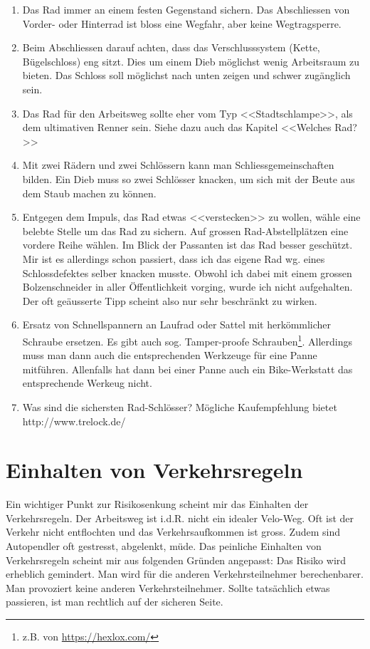 \begin{enumerate}
  \item Das Rad immer an einem festen Gegenstand sichern. Das Abschliessen von Vorder- oder Hinterrad ist bloss eine 
    Wegfahr, aber keine Wegtragsperre.

  \item Beim Abschliessen darauf achten, dass das Verschlusssystem (Kette, Bügelschloss) eng sitzt.
    Dies um einem Dieb möglichst wenig Arbeitsraum zu bieten. Das Schloss soll möglichst nach unten zeigen und
    schwer zugänglich sein.

  \item Das Rad für den Arbeitsweg sollte eher vom Typ <<Stadtschlampe>>, als dem ultimativen Renner sein.
    Siehe dazu auch das Kapitel <<Welches Rad?>>

  \item Mit zwei Rädern und zwei Schlössern kann man Schliessgemeinschaften bilden.
    Ein Dieb muss so zwei Schlösser knacken, um sich mit der Beute aus dem Staub machen zu können.

  \item Entgegen dem Impuls, das Rad etwas <<verstecken>> zu wollen, wähle eine belebte Stelle um das Rad zu sichern.
    Auf grossen Rad-Abstellplätzen eine vordere Reihe wählen.
    Im Blick der Passanten ist das Rad besser geschützt.
    Mir ist es allerdings schon passiert, dass ich das eigene Rad wg. eines Schlossdefektes selber knacken musste.
    Obwohl ich dabei mit einem grossen Bolzenschneider in aller Öffentlichkeit vorging, wurde ich nicht aufgehalten.
    Der oft geäusserte Tipp scheint also nur sehr beschränkt zu wirken.

  \item Ersatz von Schnellspannern an Laufrad oder Sattel mit herkömmlicher Schraube ersetzen.
    Es gibt auch sog. Tamper-proofe Schrauben\footnote{z.B. von \url{https://hexlox.com/}}.
    Allerdings muss man dann auch die entsprechenden Werkzeuge
    für eine Panne mitführen.
    Allenfalls hat dann bei einer Panne auch ein Bike-Werkstatt das entsprechende Werkeug nicht.

  \item Was sind die sichersten Rad-Schlösser? Mögliche Kaufempfehlung bietet http://www.trelock.de/

\end{enumerate}

\section{Einhalten von Verkehrsregeln}
Ein wichtiger Punkt zur Risikosenkung scheint mir das Einhalten der Verkehrsregeln. Der Arbeitsweg ist i.d.R. nicht ein idealer Velo-Weg. Oft ist der Verkehr nicht entflochten und das Verkehrsaufkommen ist gross. Zudem sind Autopendler oft gestresst, abgelenkt, müde.  Das peinliche Einhalten von Verkehrsregeln scheint mir aus folgenden Gründen angepasst:
Das Risiko wird erheblich gemindert. Man wird für die anderen Verkehrsteilnehmer berechenbarer.
Man provoziert keine anderen Verkehrsteilnehmer.
Sollte tatsächlich etwas passieren, ist man rechtlich auf der sicheren Seite.
\cite{Flieshardt2015}

